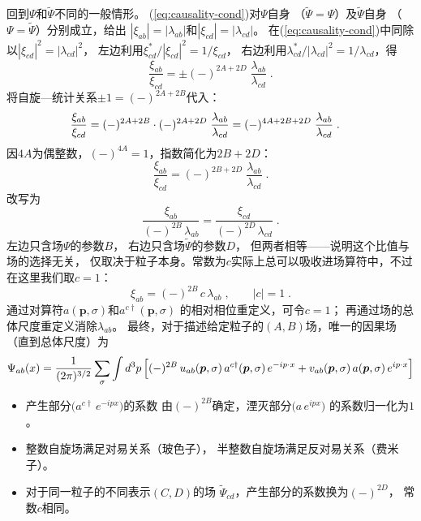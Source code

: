 \vspace{2ex}
\medskip
回到$\Psi$和$\widetilde{\Psi}$不同的一般情形。
(\ref{eq:causality-cond})对$\Psi$自身
（$\widetilde{\Psi}=\Psi$）及$\widetilde{\Psi}$自身
（$\Psi=\widetilde{\Psi}$）分别成立，给出
$|\xi_{ab}|=|\lambda_{ab}|$和$|\xi_{cd}|=|\lambda_{cd}|$。
在(\ref{eq:causality-cond})中同除以$|\xi_{cd}|^{2}=|\lambda_{cd}|^{2}$，
左边利用$\xi_{cd}^{*}/|\xi_{cd}|^{2}=1/\xi_{cd}$，
右边利用$\lambda_{cd}^{*}/|\lambda_{cd}|^{2}=1/\lambda_{cd}$，得
\[
  \frac{\xi_{ab}}{\xi_{cd}}
  = \pm(-)^{2A+2D}\;\frac{\lambda_{ab}}{\lambda_{cd}}\;.
\]
将自旋—统计关系$\pm 1=(-)^{2A+2B}$代入：
\begin{align}
  \frac{\xi_{ab}}{\xi_{cd}}
  &= (-)^{2A+2B}\cdot(-)^{2A+2D}\;
    \frac{\lambda_{ab}}{\lambda_{cd}}
  = (-)^{4A+2B+2D}\;\frac{\lambda_{ab}}{\lambda_{cd}}\;.\notag
\end{align}
因$4A$为偶整数，$(-)^{4A}=1$，指数简化为$2B+2D$：
\[
  \frac{\xi_{ab}}{\xi_{cd}}
  = (-)^{2B+2D}\;\frac{\lambda_{ab}}{\lambda_{cd}}\;.
\]
改写为
\[
  \frac{\xi_{ab}}{(-)^{2B}\,\lambda_{ab}}
  = \frac{\xi_{cd}}{(-)^{2D}\,\lambda_{cd}}\;.
\]
左边只含场$\Psi$的参数$B$，
右边只含场$\widetilde{\Psi}$的参数$D$，
但两者相等——说明这个比值与场的选择无关，
仅取决于粒子本身。常数为$c$实际上总可以吸收进场算符中，不过在这里我们取$c=1$：
\begin{equation}\label{eq:xi-lambda}
  \xi_{ab} = (-)^{2B}\,c\,\lambda_{ab}\;,\qquad |c|=1\;.
\end{equation}
通过对算符$a(\boldsymbol{p},\sigma)$和$a^{c\dagger}(\boldsymbol{p},\sigma)$
的相对相位重定义，可令$c=1$；
再通过场的总体尺度重定义消除$\lambda_{ab}$。
最终，对于描述给定粒子的$(A,B)$场，唯一的因果场
（直到总体尺度）为
\begin{equation}\label{eq:final-field}
  \Psi_{ab}(x)
  = \frac{1}{(2\pi)^{3/2}}\sum_{\sigma}\int d^{3}p\,
    \Bigl[(-)^{2B}\,u_{ab}(\boldsymbol{p},\sigma)\,
      a^{c\dagger}(\boldsymbol{p},\sigma)\,e^{-ip\cdot x}
    + v_{ab}(\boldsymbol{p},\sigma)\,
      a(\boldsymbol{p},\sigma)\,e^{ip\cdot x}\Bigr]
\end{equation}
\begin{itemize}
  \item 产生部分$\bigl(a^{c\dagger}\,e^{-ipx}\bigr)$的系数
        由$(-)^{2B}$确定，湮灭部分$\bigl(a\,e^{ipx}\bigr)$
        的系数归一化为$1$。
  \item 整数自旋场满足对易关系（玻色子），
        半整数自旋场满足反对易关系（费米子）。
  \item 对于同一粒子的不同表示$(C,D)$的场
        $\widetilde{\Psi}_{cd}$，产生部分的系数换为$(-)^{2D}$，
        常数$c$相同。
\end{itemize}


\newpage\newpage\newpage\newpage\newpage